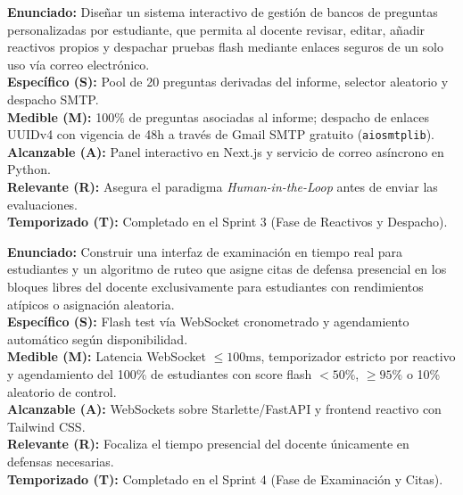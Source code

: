 \documentclass[11pt,a4paper]{article}
\begin{document}
\begin{tcolorbox}[title=OE3: Generación Dinámica y Supervisión Humana de Reactivos Flash]
\textbf{Enunciado:} Diseñar un sistema interactivo de gestión de bancos de preguntas personalizadas por estudiante, que permita al docente revisar, editar, añadir reactivos propios y despachar pruebas flash mediante enlaces seguros de un solo uso vía correo electrónico.\\
\textbf{Específico (S):} Pool de 20 preguntas derivadas del informe, selector aleatorio y despacho SMTP.\\
\textbf{Medible (M):} 100\% de preguntas asociadas al informe; despacho de enlaces UUIDv4 con vigencia de 48h a través de Gmail SMTP gratuito (\texttt{aiosmtplib}).\\
\textbf{Alcanzable (A):} Panel interactivo en Next.js y servicio de correo asíncrono en Python.\\
\textbf{Relevante (R):} Asegura el paradigma \textit{Human-in-the-Loop} antes de enviar las evaluaciones.\\
\textbf{Temporizado (T):} Completado en el Sprint 3 (Fase de Reactivos y Despacho).
\end{tcolorbox}

\begin{tcolorbox}[title=OE4: Evaluación en Tiempo Real y Ruteo Automatizado de Citas]
\textbf{Enunciado:} Construir una interfaz de examinación en tiempo real para estudiantes y un algoritmo de ruteo que asigne citas de defensa presencial en los bloques libres del docente exclusivamente para estudiantes con rendimientos atípicos o asignación aleatoria.\\
\textbf{Específico (S):} Flash test vía WebSocket cronometrado y agendamiento automático según disponibilidad.\\
\textbf{Medible (M):} Latencia WebSocket $\le 100\text{ms}$, temporizador estricto por reactivo y agendamiento del 100\% de estudiantes con score flash $< 50\%$, $\ge 95\%$ o 10\% aleatorio de control.\\
\textbf{Alcanzable (A):} WebSockets sobre Starlette/FastAPI y frontend reactivo con Tailwind CSS.\\
\textbf{Relevante (R):} Focaliza el tiempo presencial del docente únicamente en defensas necesarias.\\
\textbf{Temporizado (T):} Completado en el Sprint 4 (Fase de Examinación y Citas).
\end{tcolorbox}
\end{document}
